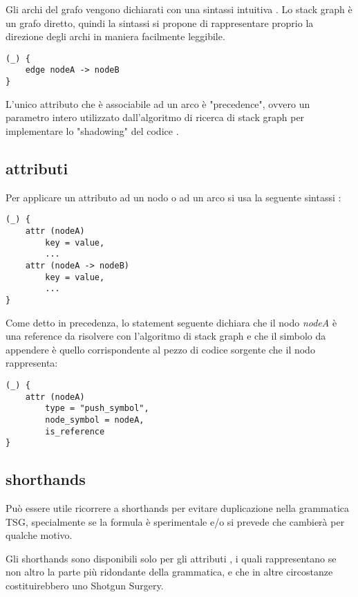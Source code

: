 Gli archi del grafo vengono dichiarati con una sintassi intuitiva \cite{TreeSitterGraphReferenceEdges}.
Lo stack graph \`e un grafo diretto, quindi la sintassi si propone di rappresentare proprio la direzione degli archi in maniera facilmente leggibile.

\begin{lstlisting}
(_) {
    edge nodeA -> nodeB
}
\end{lstlisting}

L'unico attributo che \`e associabile ad un arco \`e "precedence", ovvero un parametro intero utilizzato dall'algoritmo di ricerca di stack graph per implementare lo "shadowing" del codice \cite{TreeSitterStackGraphEdges}.

\subsection{attributi}

Per applicare un attributo ad un nodo o ad un arco si usa la seguente sintassi \cite{TreeSitterGraphReferenceAttributes}:

\begin{lstlisting}
(_) {
    attr (nodeA)
        key = value,
        ...
    attr (nodeA -> nodeB)
        key = value,
        ...
}
\end{lstlisting}

Come detto in precedenza, lo statement seguente dichiara che il nodo \emph{nodeA} \`e una reference da risolvere con l'algoritmo di stack graph e che il simbolo da appendere \`e quello corrispondente al pezzo di codice sorgente che il nodo rappresenta:

\begin{lstlisting}
(_) {
    attr (nodeA)
        type = "push_symbol",
        node_symbol = nodeA,
        is_reference
}
\end{lstlisting}

\subsection{shorthands}
Pu\`o essere utile ricorrere a shorthands per evitare duplicazione nella grammatica TSG, specialmente se la formula \`e sperimentale e/o si prevede che cambier\`a per qualche motivo.

Gli shorthands sono disponibili solo per gli attributi \cite{TreeSitterGraphReferenceAttributeShorthands}, i quali rappresentano se non altro la parte pi\`u ridondante della grammatica, e che in altre circostanze costituirebbero uno Shotgun Surgery.

